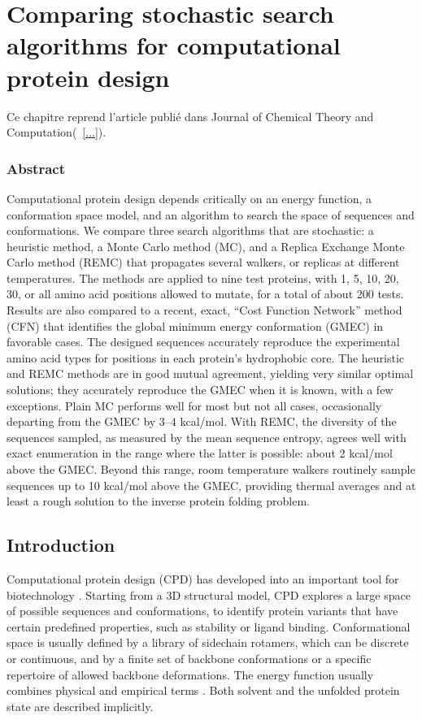 \chapter{Comparing stochastic search algorithms for computational protein design}
\label{chap:Comparaison}


Ce chapitre reprend l'article publié dans \og Journal of Chemical Theory and Computation\fg (~\ref{...}).



\subsection*{Abstract}
Computational protein design depends critically on an energy function, a conformation space model, and an
algorithm to search the space of sequences and conformations. We compare three search algorithms that are
stochastic: a heuristic method, a Monte Carlo method (MC), and a Replica Exchange Monte Carlo method (REMC)
that propagates several walkers, or replicas at different temperatures. The methods are applied to nine test
proteins, with 1, 5, 10, 20, 30, or all amino acid positions allowed to mutate, for a total of about 200 tests.
Results are also compared to a recent, exact, ``Cost Function Network'' method (CFN) that identifies the global
minimum energy conformation (GMEC) in favorable cases. The designed sequences accurately reproduce the experimental
amino acid types for positions in each protein's hydrophobic core. The heuristic and REMC methods are in good
mutual agreement, yielding very similar optimal solutions; they accurately reproduce the GMEC when it is known,
with a few exceptions. Plain MC performs well for most but not all cases, occasionally departing from the GMEC
by 3--4 kcal/mol. With REMC, the diversity of the sequences sampled, as measured by the mean sequence entropy,
agrees well with exact enumeration in the range where the latter is possible: about 2 kcal/mol above the GMEC.
Beyond this range, room temperature walkers routinely sample sequences up to 10 kcal/mol above the GMEC, providing
thermal averages and at least a rough solution to the inverse protein folding problem.

\pagebreak

\section{Introduction}
Computational protein design (CPD) has developed into an important tool for biotechnology \cite{Dantas03,
Kuhlman06,Lippow07,Saven11,Feldmeier13,Tinberg13}. Starting from a 3D structural model, CPD explores a large
space of possible sequences and conformations, to identify protein variants that have certain predefined properties,
such as stability or ligand binding. Conformational space is usually defined by a library of sidechain rotamers,
which can be discrete or continuous, and by a finite set of backbone conformations or a specific repertoire
of allowed backbone deformations. The energy function usually combines physical and empirical terms \cite{Pokala04,
Samish11,Li13}. Both solvent and the unfolded protein state are described implicitly. 

